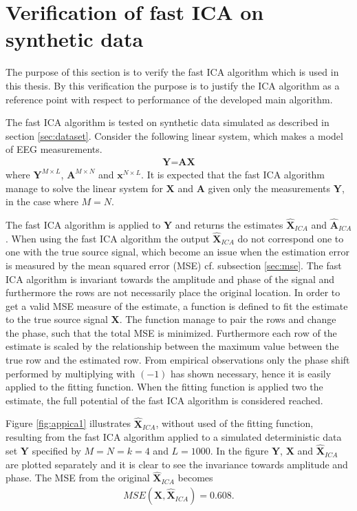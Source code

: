 \section{Verification of fast ICA on synthetic data}\label{app:ica_test}
The purpose of this section is to verify the fast ICA algorithm which is used in this thesis. By this verification the purpose is to justify the ICA algorithm as a reference point with respect to performance of the developed main algorithm.

The fast ICA algorithm is tested on synthetic data simulated as described in section \ref{sec:dataset}. 
Consider the following linear system, which makes a model of EEG measurements.  
\begin{align*}
\textbf{Y}=\textbf{AX}
\end{align*}
where $\textbf{Y}^{M\times L}$, $\textbf{A}^{M\times N}$ and $\textbf{x}^{N\times L}$. It is expected that the fast ICA algorithm manage to solve the linear system for $\textbf{X}$ and $\textbf{A}$ given only the measurements $\textbf{Y}$, in the case where $M=N$.  

The fast ICA algorithm is applied to $\textbf{Y}$ and returns the estimates $\hat{\textbf{X}}_{ICA}$ and $\hat{\textbf{A}}_{ICA}$. 
When using the fast ICA algorithm the output $\hat{\textbf{X}}_{ICA}$ do not correspond one to one with the true source signal, which become an issue when the estimation error is measured by the mean squared error (MSE) cf. subsection \ref{sec:mse}.  The fast ICA algorithm is invariant towards the amplitude and phase of the signal and furthermore the rows are not necessarily place the original location. 
In order to get a valid MSE measure of the estimate, a function is defined to fit the estimate to the true source signal $\textbf{X}$. The function manage to pair the rows and change the phase, such that the total MSE is minimized. Furthermore each row of the estimate is scaled by the relationship between the  maximum value between the true row and the estimated row.
From empirical observations only the phase shift performed by multiplying with $(-1)$ has shown necessary, hence it is easily applied to the fitting function.
When the fitting function is applied two the estimate, the full potential of the fast ICA algorithm is considered reached.       

Figure \ref{fig:appica1} illustrates $\hat{\textbf{X}}_{ICA}$, without used of the fitting function, resulting from the fast ICA algorithm applied to a simulated deterministic data set $\textbf{Y}$ specified by $M=N=k=4$ and $L=1000$. In the figure $\textbf{Y}$, $\textbf{X}$ and $\hat{\textbf{X}}_{ICA}$ are plotted separately and it is clear to see the invariance towards amplitude and phase.
The MSE from the original $\hat{\textbf{X}}_{ICA}$ becomes
\begin{align*}
MSE(\textbf{X},\hat{\textbf{X}}_{ICA}) = 0.608.
\end{align*}

